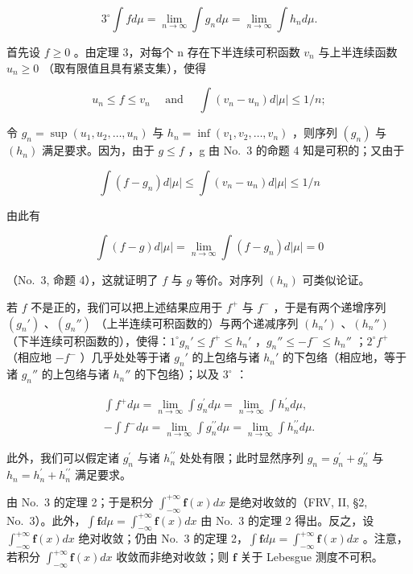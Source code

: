 \[
3 ^ {\circ} \int f d \mu = \lim _ {n \rightarrow \infty} \int g _ {n} d \mu = \lim _ {n \rightarrow \infty} \int h _ {n} d \mu .
\]

首先设 \(f \geqslant 0\) 。由定理 3，对每个 n 存在下半连续可积函数 \(v_{n}\) 与上半连续函数 \(u_{n} \geqslant 0\) （取有限值且具有紧支集），使得

\[
u _ {n} \leqslant f \leqslant v _ {n} \quad \text { and } \quad \int (v _ {n} - u _ {n}) d | \mu | \leqslant 1 / n;
\]

令 \(g_{n} = \sup(u_{1}, u_{2}, \ldots, u_{n})\) 与 \(h_{n} = \inf(v_{1}, v_{2}, \ldots, v_{n})\) ，则序列 \((g_{n})\) 与 \((h_{n})\) 满足要求。因为，由于 \(g \leqslant f\) ，g 由 No.~3 的命题 4 知是可积的；又由于

\[
\int (f - g _ {n}) d | \mu | \leqslant \int (v _ {n} - u _ {n}) d | \mu | \leqslant 1 / n
\]

由此有

\[
\int (f - g) d | \mu | = \lim _ {n \rightarrow \infty} \int (f - g _ {n}) d | \mu | = 0
\]

（No.~3, 命题 4），这就证明了 \(f\) 与 \(g\) 等价。对序列 \((h_n)\) 可类似论证。

若 \(f\) 不是正的，我们可以把上述结果应用于 \(f^{+}\) 与 \(f^{-}\) ，于是有两个递增序列 \((g_n')\) 、\((g_n'')\) （上半连续可积函数的）与两个递减序列 \((h_n')\) 、\((h_n'')\) （下半连续可积函数的），使得：\(1^\circ g_n' \leqslant f^{+} \leqslant h_n'\) ，\(g_n'' \leqslant -f^{-} \leqslant h_n''\) ；\(2^\circ f^{+}\) （相应地 \(-f^{-}\) ）几乎处处等于诸 \(g_n'\) 的上包络与诸 \(h_n'\) 的下包络（相应地，等于诸 \(g_n''\) 的上包络与诸 \(h_n''\) 的下包络）；以及 \(3^\circ\) ：

\[
\begin{array}{r} \int f ^ {+} d \mu = \lim _ {n \to \infty} \int g _ {n} ^ {\prime} d \mu = \lim _ {n \to \infty} \int h _ {n} ^ {\prime} d \mu , \\ - \int f ^ {-} d \mu = \lim _ {n \to \infty} \int g _ {n} ^ {\prime \prime} d \mu = \lim _ {n \to \infty} \int h _ {n} ^ {\prime \prime} d \mu . \end{array}
\]

此外，我们可以假定诸 \(g_{n}^{\prime}\) 与诸 \(h_{n}^{\prime\prime}\) 处处有限；此时显然序列 \(g_{n}=g_{n}^{\prime}+g_{n}^{\prime\prime}\) 与 \(h_{n}=h_{n}^{\prime}+h_{n}^{\prime\prime}\) 满足要求。

由 No.~3 的定理 2；于是积分 \(\int_{-\infty}^{+\infty} \mathbf{f}(x) dx\) 是绝对收敛的（FRV, II, §2, No.~3）。此外，\(\int \mathbf{f} d\mu = \int_{-\infty}^{+\infty} \mathbf{f}(x) dx\) 由 No.~3 的定理 2 得出。反之，设 \(\int_{-\infty}^{+\infty} \mathbf{f}(x) dx\) 绝对收敛；仍由 No.~3 的定理 2，\(\int \mathbf{f} d\mu = \int_{-\infty}^{+\infty} \mathbf{f}(x) dx\) 。注意，若积分 \(\int_{-\infty}^{+\infty} \mathbf{f}(x) dx\) 收敛而非绝对收敛；则 \(\mathbf{f}\) 关于 Lebesgue 测度不可积。

